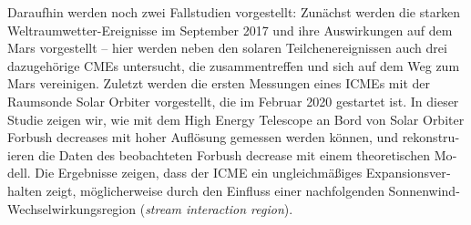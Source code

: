 \begin{otherlanguage}{ngerman}
Daraufhin werden noch zwei Fallstudien vorgestellt: Zunächst werden die starken Weltraumwetter-Ereignisse im September 2017 und ihre Auswirkungen auf dem Mars vorgestellt -- hier werden neben den solaren Teilchenereignissen auch drei dazugehörige \acp{CME} untersucht, die zusammentreffen und sich auf dem Weg zum Mars vereinigen. Zuletzt werden die ersten Messungen eines \acp{ICME} mit der Raumsonde Solar Orbiter vorgestellt, die im Februar 2020 gestartet ist. In dieser Studie zeigen wir, wie mit dem High Energy Telescope an Bord von Solar Orbiter Forbush decreases mit hoher Auflösung gemessen werden können, und rekonstruieren die Daten des beobachteten Forbush decrease mit einem theoretischen Modell. Die Ergebnisse zeigen, dass der \ac{ICME} ein ungleichmäßiges Expansionsverhalten zeigt, möglicherweise durch den Einfluss einer nachfolgenden Sonnenwind-Wechselwirkungsregion (\textit{stream interaction region}).
\end{otherlanguage}